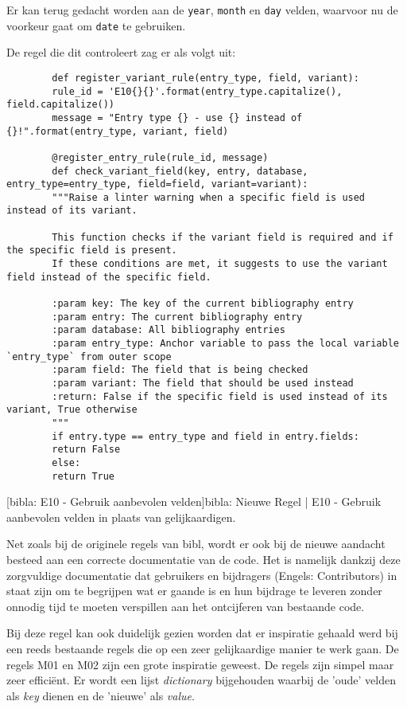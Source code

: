 Er kan terug gedacht worden aan de \texttt{year}, \texttt{month} en \texttt{day} velden, waarvoor nu de voorkeur gaat om \texttt{date} te gebruiken.

De regel die dit controleert zag er als volgt uit:

\begin{verbatim}
        def register_variant_rule(entry_type, field, variant):
        rule_id = 'E10{}{}'.format(entry_type.capitalize(), field.capitalize())
        message = "Entry type {} - use {} instead of {}!".format(entry_type, variant, field)
        
        @register_entry_rule(rule_id, message)
        def check_variant_field(key, entry, database, entry_type=entry_type, field=field, variant=variant):
        """Raise a linter warning when a specific field is used instead of its variant.
        
        This function checks if the variant field is required and if the specific field is present.
        If these conditions are met, it suggests to use the variant field instead of the specific field.
        
        :param key: The key of the current bibliography entry
        :param entry: The current bibliography entry
        :param database: All bibliography entries
        :param entry_type: Anchor variable to pass the local variable `entry_type` from outer scope
        :param field: The field that is being checked
        :param variant: The field that should be used instead
        :return: False if the specific field is used instead of its variant, True otherwise
        """
        if entry.type == entry_type and field in entry.fields:
        return False
        else:
        return True
\end{verbatim}
[bibla: E10 - Gebruik aanbevolen velden]{bibla: Nieuwe Regel | E10 - Gebruik aanbevolen velden in plaats van gelijkaardigen. \label{lst:bibla_NR_E10}}

Net zoals bij de originele regels van bibl, wordt er ook bij de nieuwe aandacht besteed aan een correcte documentatie van de code. Het is namelijk dankzij deze zorgvuldige documentatie dat gebruikers en bijdragers (Engels: Contributors) in staat zijn om te begrijpen wat er gaande is en hun bijdrage te leveren zonder onnodig tijd te moeten verspillen aan het ontcijferen van bestaande code.
    
Bij deze regel kan ook duidelijk gezien worden dat er inspiratie gehaald werd bij een reeds bestaande regels die op een zeer gelijkaardige manier te werk gaan. De regels M01 en M02 zijn een grote inspiratie geweest. De regels zijn simpel maar zeer efficiënt. Er wordt een lijst \emph{dictionary} bijgehouden waarbij de 'oude' velden als \emph{key} dienen en de 'nieuwe' als \emph{value}.
